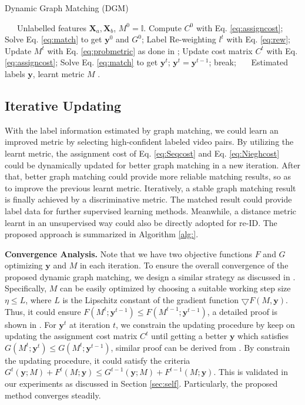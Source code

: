 \documentclass[10pt,twocolumn,letterpaper]{article}
\begin{document}
\begin{algorithm}[t]
\caption{Dynamic Graph Matching (DGM)}
\label{alg:}
\begin{algorithmic}[1]
    \renewcommand{\algorithmicrequire}{\textbf{Input:}}
    \renewcommand\algorithmicensure {\textbf{Output:}}
    \REQUIRE ~~\ Unlabelled features $\mathbf{X}_a, \mathbf{X}_b$, $M^0 = \mathbb{I}$.
    \STATE Compute $C^0$ with Eq. \ref{eq:assigncost};
    \STATE Solve Eq. \ref{eq:match} to get $\mathbf{y}^0$ and $G^0$;
    \STATE Label Re-weighting $l^t$ with Eq. \ref{eq:rew};
    \STATE Update $M^t$ with Eq. \ref{eq:probmetric} as done in \cite{iccv15liao};
    \STATE Update cost matrix $C^t$ with Eq. \ref{eq:assigncost};
    \STATE Solve Eq. \ref{eq:match} to get $\mathbf{y}^t$;
    \STATE  $\mathbf{y}^t = \mathbf{y}^{t-1}$;
    \ENDIF
    \STATE  break;
    \ENDIF
    \ENDFOR
    \ENSURE ~~\ Estimated labels $\mathbf{y}$, learnt metric $M$ .
\end{algorithmic}
\end{algorithm}
\subsection{Iterative Updating}\label{sec:iter}
 With the label information estimated by graph matching, we could learn an improved metric by selecting high-confident labeled video pairs. By utilizing the learnt metric, the assignment cost of Eq. \ref{eq:Seqcost} and Eq. \ref{eq:Nieghcost} could be dynamically updated for better graph matching in a new iteration. After that, better graph matching could provide more reliable matching results, so as to improve the previous learnt metric. Iteratively, a stable graph matching result is finally achieved by a discriminative metric. The matched result could provide label data for further supervised learning methods. Meanwhile, a distance metric learnt in an unsupervised way could also be directly adopted for re-ID. The proposed approach is summarized in Algorithm \ref{alg:}.


\textbf{Convergence Analysis.} Note that we have two objective functions $F$ and $G$ optimizing $\mathbf{y}$ and $M$ in each iteration. To ensure the overall convergence of the proposed dynamic graph matching, we design a similar strategy as discussed in \cite{eccv12graph}. Specifically, $M$ can be easily optimized by choosing a suitable working step size $\eta\leq L$, where $L$ is the Lipschitz constant of the gradient function $\bigtriangledown F(M,\mathbf{y})$. Thus, it could ensure $F(M^{t};\mathbf{y}^{t-1})\leq F(M^{t-1};\mathbf{y}^{t-1})$, a detailed proof is shown in \cite{apg09}. For $\mathbf{y}^t$ at iteration $t$, we constrain the updating procedure by keep on updating the assignment cost matrix $C^t$ until getting a better $\mathbf{y}$ which satisfies $G(M^{t};\mathbf{y}^{t})\leq G(M^{t};\mathbf{y}^{t-1})$, similar proof can be derived from \cite{eccv12graph}. By constrain the updating procedure, it could satisfy the criteria $G^{t}(\mathbf{y};M) + F^{t}(M;\mathbf{y}) \leq G^{t-1}(\mathbf{y};M) + F^{t-1}(M;\mathbf{y})$. This is validated in our experiments as discussed in Section \ref{sec:self}. Particularly, the proposed method converges steadily.
\end{document}

